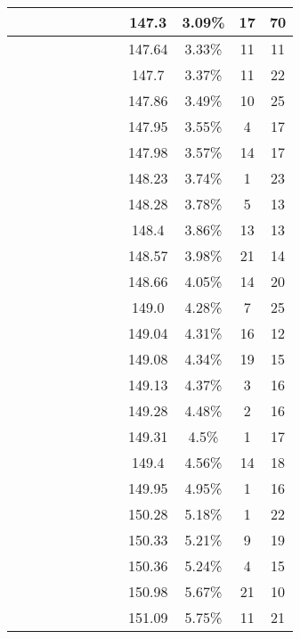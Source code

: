 \begin{center}
\begin{longtable}{|c|c|c|c|c|c|c|c|c|c|c|c|}
 \x &  &  \x &  \x &  &  \x &  &  \x & 147.3 & 3.09\% & 17 & 70 \\ \hline
 \x &  &  &  &  &  \x &  \x &  \x & 147.64 & 3.33\% & 11 & 11 \\ \hline
 \x &  &  \x &  &  &  &  &  \x & 147.7 & 3.37\% & 11 & 22 \\ \hline
 \x &  \x &  \x &  &  &  &  &  \x & 147.86 & 3.49\% & 10 & 25 \\ \hline
 \x &  &  &  &  \x &  \x &  \x &  \x & 147.95 & 3.55\% & 4 & 17 \\ \hline
 \x &  &  \x &  &  &  \x &  &  & 147.98 & 3.57\% & 14 & 17 \\ \hline
 \x &  &  &  &  \x &  \x &  \x &  & 148.23 & 3.74\% & 1 & 23 \\ \hline
 \x &  \x &  &  \x &  &  \x &  \x &  \x & 148.28 & 3.78\% & 5 & 13 \\ \hline
 \x &  &  &  \x &  \x &  \x &  \x &  & 148.4 & 3.86\% & 13 & 13 \\ \hline
 \x &  \x &  &  \x &  &  \x &  &  & 148.57 & 3.98\% & 21 & 14 \\ \hline
 \x &  \x &  \x &  \x &  &  &  &  \x & 148.66 & 4.05\% & 14 & 20 \\ \hline
 \x &  \x &  \x &  \x &  &  &  &  & 149.0 & 4.28\% & 7 & 25 \\ \hline
 \x &  \x &  &  &  \x &  &  &  \x & 149.04 & 4.31\% & 16 & 12 \\ \hline
 \x &  &  &  \x &  &  \x &  &  & 149.08 & 4.34\% & 19 & 15 \\ \hline
 \x &  &  \x &  &  &  \x &  \x &  & 149.13 & 4.37\% & 3 & 16 \\ \hline
 \x &  \x &  \x &  &  &  \x &  \x &  \x & 149.28 & 4.48\% & 2 & 16 \\ \hline
 \x &  \x &  &  \x &  \x &  \x &  &  & 149.31 & 4.5\% & 1 & 17 \\ \hline
 \x &  &  \x &  &  \x &  &  &  \x & 149.4 & 4.56\% & 14 & 18 \\ \hline
 \x &  \x &  \x &  &  &  \x &  &  \x & 149.95 & 4.95\% & 1 & 16 \\ \hline
 \x &  &  \x &  &  \x &  \x &  \x &  & 150.28 & 5.18\% & 1 & 22 \\ \hline
 \x &  \x &  \x &  \x &  &  \x &  &  \x & 150.33 & 5.21\% & 9 & 19 \\ \hline
 \x &  \x &  &  &  &  \x &  \x &  \x & 150.36 & 5.24\% & 4 & 15 \\ \hline
 \x &  \x &  &  &  &  \x &  &  \x & 150.98 & 5.67\% & 21 & 10 \\ \hline
 \x &  &  &  &  \x &  &  &  \x & 151.09 & 5.75\% & 11 & 21 \\ \hline

\end{longtable}
\end{center}
